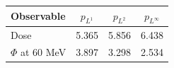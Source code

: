 \begin{tabular}{lccc}
\toprule
Observable & $p_{L^1}$ & $p_{L^2}$ & $p_{L^\infty}$ \\
\midrule
Dose & 5.365 & 5.856 & 6.438 \\
$\Phi$ at 60 MeV & 3.897 & 3.298 & 2.534 \\
\bottomrule
\end{tabular}
